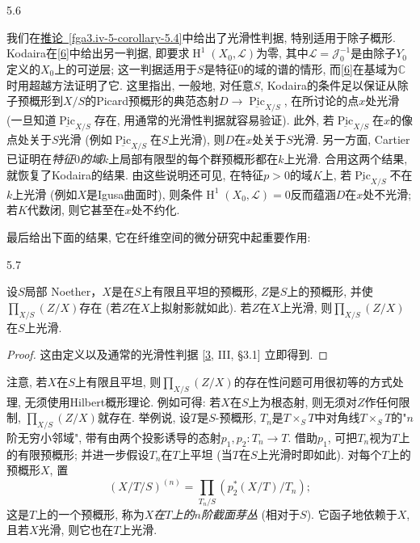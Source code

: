 \begin{remark}{5.6}\label{fga3.iv-5-remark-5.6}\skipsinglepar
\par{}我们在\hyperref[fga3.iv-5-corollary-5.4]{推论~\ref*{fga3.iv-5-corollary-5.4}}中给出了光滑性判据, 特别适用于除子概形. Kodaira在\hyperref[Kod1956]{[6]}中给出另一判据, 即要求\(\operatorname {H}^1(X_0,\mathscr {L})\)为零, 其中\(\mathscr {L}=\mathscr {J}_0^{-1}\)是由除子\(Y_0\)定义的\(X_0\)上的可逆层; 这一判据适用于\(S\)是特征\(0\)的域的谱的情形, 而\hyperref[Kod1956]{[6]}在基域为\(\mathbb {C}\)时用超越方法证明了它. 这里指出, 一般地, 对任意\(S\), Kodaira的条件足以保证从除子预概形到\(X/S\)的Picard预概形的典范态射\(D\to \underline {\operatorname {Pic}}_{X/S}\), 在所讨论的点\(x\)处光滑 (一旦知道\(\underline {\operatorname {Pic}}_{X/S}\)存在, 用通常的光滑性判据就容易验证). 此外, 若\(\underline {\operatorname {Pic}}_{X/S}\)在\(x\)的像点处关于\(S\)光滑 (例如\(\underline {\operatorname {Pic}}_{X/S}\)在\(S\)上光滑), 则\(D\)在\(x\)处关于\(S\)光滑. 另一方面, Cartier已证明在\emph{特征\(0\)的域\(k\)}上局部有限型的每个群预概形都在\(k\)上光滑. 合用这两个结果, 就恢复了Kodaira的结果. 由这些说明还可见, 在特征\(p>0\)的域\(K\)上, 若\(\underline {\operatorname {Pic}}_{X/S}\)不在\(k\)上光滑 (例如\(X\)是Igusa曲面时), 则条件\(\operatorname {H}^1(X_0,\mathscr {L})=0\)反而蕴涵\(D\)在\(x\)处不光滑; 若\(K\)代数闭, 则它甚至在\(x\)处不约化.
\end{remark}
\par{}最后给出下面的结果, 它在纤维空间的微分研究中起重要作用:
\begin{proposition}{5.7}\label{fga3.iv-5-proposition-5.7}\skipsinglepar
\par{}设\(S\)局部 Noether，\(X\)是在\(S\)上有限且平坦的预概形, \(Z\)是\(S\)上的预概形, 并使\(\prod _{X/S}(Z/X)\)存在 (若\(Z\)在\(X\)上拟射影就如此). 若\(Z\)在\(X\)上光滑, 则\(\prod _{X/S}(Z/X)\)在\(S\)上光滑.
\begin{proof}
\par{}这由定义以及通常的光滑性判据 [\hyperref[Gro1960b]{3}, III, §3.1] 立即得到.
\end{proof}
\end{proposition}
\par{}注意, 若\(X\)在\(S\)上有限且平坦, 则\(\prod _{X/S}(Z/X)\)的存在性问题可用很初等的方式处理, 无须使用Hilbert概形理论. 例如可得: 若\(X\)在\(S\)上为根态射, 则无须对\(Z\)作任何限制, \(\prod _{X/S}(Z/X)\)就存在. 举例说, 设\(T\)是\(S\)-预概形, \(T_n\)是\(T\times _S T\)中对角线\(T\times _S T\)的"\(n\)阶无穷小邻域", 带有由两个投影诱导的态射\(p_1,p_2\colon  T_n\to  T\). 借助\(p_1\), 可把\(T_n\)视为\(T\)上的有限预概形; 并进一步假设\(T_n\)在\(T\)上平坦 (当\(T\)在\(S\)上光滑时即如此). 对每个\(T\)上的预概形\(X\), 置\[     (X/T/S)^{(n)}     = \prod _{T_n/S}(p_2^*(X/T)/T_n);\] 这是\(T\)上的一个预概形, 称为\emph{\(X\)在\(T\)上的\(n\)阶截面芽丛} (相对于\(S\)). 它函子地依赖于\(X\), 且若\(X\)光滑, 则它也在\(T\)上光滑.
